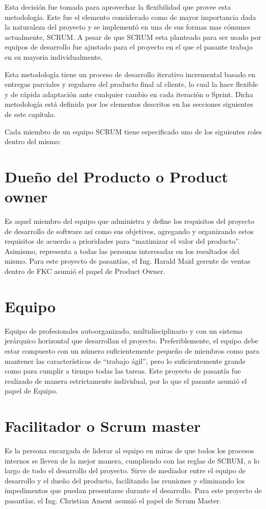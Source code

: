 Esta decisión fue tomada para aprovechar la flexibilidad que provee esta metodología. Este fue el elemento considerado como de mayor importancia dada la naturaleza del proyecto y se implementó en una de sus formas mas cómunes actualmente, SCRUM. A pesar de que SCRUM esta planteado para ser usado por equipos de desarrollo fue ajustado para el proyecto en el que el pasante trabajo en su mayoria individualmente.

Esta metodología tiene un proceso de desarrollo iterativo incremental basado en entregas parciales y regulares del producto final al cliente, lo cual la hace flexible y de rápida adaptación ante cualquier cambio en cada iteración o Sprint. Dicha metodología está definida por los elementos descritos en las secciones siguientes de este capítulo.

Cada miembro de un equipo SCRUM tiene especificado uno de los siguientes roles dentro del mismo:

\section{Dueño del Producto o Product owner}
Es aquel miembro del equipo que administra y define los requisitos del proyecto de desarrollo de software así como sus objetivos, agregando y organizando estos requisitos de acuerdo a prioridades para “maximizar el valor del producto”. Asimismo, representa a todas las personas interesadas en los resultados del mismo.
Para este proyecto de pasantías, el Ing. Harald Maid gerente de ventas dentro de FKC asumió el papel de Product Owner.

\section{Equipo}
Equipo de profesionales autoorganizado, multidisciplinario y con un sistema jerárquico horizontal que desarrollan el proyecto. Preferiblemente, el equipo debe estar compuesto con un número suficientemente pequeño de miembros como para mantener las características de “trabajo ágil”, pero lo suficientemente grande como para cumplir a tiempo todas las tareas.
Este proyecto de pasantía fue realizado de manera estrictamente individual, por lo que el pasante asumió el papel de Equipo.

\section{Facilitador o Scrum master}
Es la persona encargada de liderar al equipo en miras de que todos los procesos internos se lleven de la mejor manera, cumpliendo con las reglas de SCRUM, a lo largo de todo el desarrollo del proyecto. Sirve de mediador entre el equipo de desarrollo y el dueño del producto, facilitando las reuniones y eliminando los impedimentos que puedan presentarse durante el desarrollo.
Para este proyecto de pasantías, el Ing. Christian Ament asumió el papel de Scrum Master.

